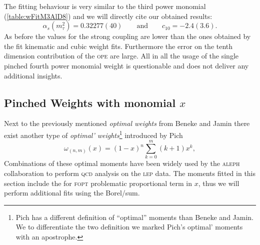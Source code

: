 \documentclass[../../index.tex]{subfiles}
\begin{document}
The fitting behaviour is very similar to the third power monomial
(\cref{table:wFitM3AlD8}) and we will directly cite our obtained results:
\begin{equation}
  \alpha_s(m_\tau^2) = 0.32277(40) \qquad \text{and} \qquad c_{10}=-2.4(3.6).
\end{equation}
As before the values for the strong coupling are lower than the ones obtained by
the fit kinematic and cubic weight fits. Furthermore the error on the tenth
dimension contribution of the \textsc{ope} are large. All in all the usage of
the single pinched fourth power monomial weight is questionable and does not
deliver any additional insights.


\subsection{Pinched Weights with monomial \(x\)}
Next to the previously mentioned \textit{optimal weights} from Beneke and Jamin
\cite{Beneke2012} there exist another type of \textit{optimal'
  weights}\footnote{Pich has a different definition of ``optimal'' moments than
  Beneke and Jamin. We to differentiate the two definition we marked Pich's
  optimal' moments with an apostrophe.} introduced by Pich \cite{LeDiberder1992}
\begin{equation}
  \omega_{(n,m)}(x) = (1-x)^n\sum_{k=0}^m (k+1)x^k,
\end{equation}
Combinations of these optimal moments have been widely used by the
\textsc{aleph} collaboration to perform \textsc{qcd} analysis on the
\textsc{lep} data. The moments fitted in this section include the for
\textsc{fopt} problematic proportional term in \(x\), thus we will perform
additional fits using the Borel\-/sum.
\end{document}
